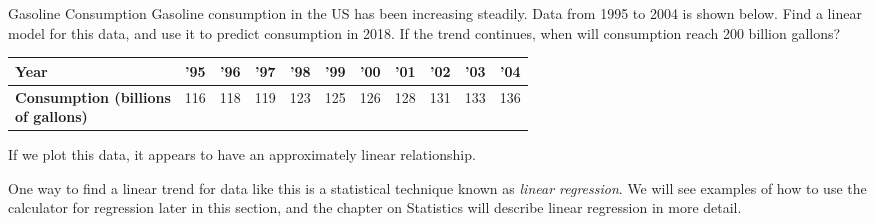 \begin{example}[https://www.youtube.com/watch?v=QoOdfeLBN0o]{Gasoline Consumption}
Gasoline consumption in the US has been increasing steadily.  Data from 1995 to 2004 is shown below.  Find a linear model for this data, and use it to predict consumption in 2018.  If the trend continues, when will consumption reach 200 billion gallons?

\solline
{}
\begin{center}
\begin{tabular}{|p{1in} | c | c | c | c | c | c | c | c | c | c|}
\hline
\textbf{Year} & '95 & '96 & '97 & '98 & '99 & '00 & '01 & '02 & '03 & '04\\
\hline
\parbox{0.9in}{\textbf{Consumption (billions}\\ \textbf{of gallons)}} & 116 & 118 & 119 & 123 & 125 & 126 & 128 & 131 & 133 & 136\\
\hline
\end{tabular}
\end{center}

If we plot this data, it appears to have an approximately linear relationship.
\begin{center}
\end{center}

One way to find a linear trend for data like this is a statistical technique known as \textit{linear regression}.  We will see examples of how to use the calculator for regression later in this section, and the chapter on Statistics will describe linear regression in more detail.


\end{example}
